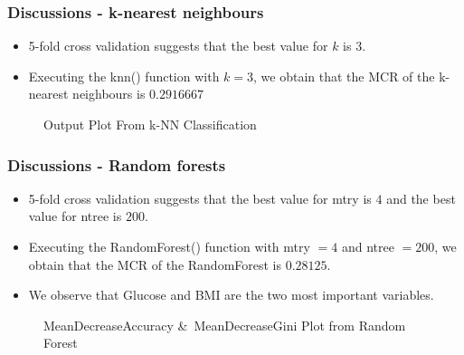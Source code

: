 \documentclass{beamer}
\begin{document}
\begin{frame}
    \frametitle{Discussions - k-nearest neighbours}
        \begin{itemize}
            \setlength\itemsep{1em}
            \item 5-fold cross validation suggests that the best value for $k$ is $3$.
            \item Executing the knn() function with $k=3$, we obtain that the MCR of the k-nearest neighbours is $0.2916667$
        \end{itemize}
        \begin{figure}[h!]
            \centering
            \caption{Output Plot From k-NN Classification} 
            \label{fig:KNNPlot}
        \end{figure}
\end{frame}

\begin{frame}
    \frametitle{Discussions - Random forests}
        \begin{itemize}
            \setlength\itemsep{1em}
            \item 5-fold cross validation suggests that the best value for mtry is $4$ and the best value for ntree is $200$.
            \item Executing the RandomForest()  function with mtry $=4$ and ntree $=200$, we obtain that the MCR of the RandomForest is $0.28125$.
            \item We observe that Glucose and BMI are the two most important variables.
        \end{itemize}
        \begin{figure}[h!]
            \centering
            \caption{MeanDecreaseAccuracy {\&}\ MeanDecreaseGini Plot from Random Forest} 
            \label{fig:RFPlot}
        \end{figure}
\end{frame}
\end{document}
